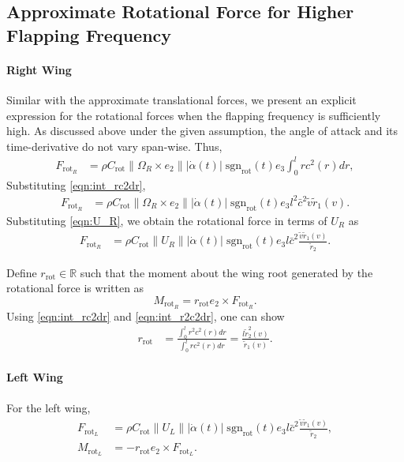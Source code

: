 \documentclass[conf]{new-aiaa}
\newcommand{\rot}{\ensuremath{\mathrm{rot}}}
\renewcommand{\Re}{\ensuremath{\mathbb{R}}}
\begin{document}
\subsection{Approximate Rotational Force for Higher Flapping Frequency}

\paragraph{Right Wing}

Similar with the approximate translational forces, we present an explicit expression for the rotational forces when the flapping frequency is sufficiently high. 
As discussed above under the given assumption, the angle of attack and its time-derivative do not vary span-wise.
Thus,
\begin{align*}
    F_{\rot_R} & = \rho C_\rot  \|\Omega_R \times e_2 \| |\dot\alpha(t)|\; \mathrm{sgn}_\rot(t)  e_3 \int_0^l r c^2(r) dr,
\end{align*}
Substituting \eqref{eqn:int_rc2dr},
\begin{align*}
    F_{\rot_R} & = \rho C_\rot  \|\Omega_R \times e_2 \| |\dot\alpha(t)|\; \mathrm{sgn}_\rot(t)  e_3 l^2 \bar c^2 \tilde v \tilde r_1(v).
\end{align*}
Substituting \eqref{eqn:U_R}, we obtain the rotational force in terms of $U_R$ as 
\begin{align}
    F_{\rot_R} & = \rho C_\rot  \|U_R \| |\dot\alpha(t)|\; \mathrm{sgn}_\rot(t)  e_3 l \bar c^2 \frac{\tilde v \tilde r_1(v)}{\tilde r_2}. \label{eqn:F_rot}
\end{align}

Define $r_\rot\in\Re$ such that the moment about the wing root generated by the rotational force is written as
\begin{equation}
    M_{\rot_R} = r_\rot e_2 \times F_{\rot_R}.
\end{equation}
Using \eqref{eqn:int_rc2dr} and \eqref{eqn:int_r2c2dr}, one can show
\begin{align}
    r_\rot & = \frac{\int_0^l r^2 c^2(r) dr}{\int_0^l r c^2(r) dr} = \frac{l\tilde r_2^2(v)}{\tilde r_1(v)}.
\end{align}

\paragraph{Left Wing}

For the left wing,
\begin{align}
    F_{\rot_L} & = \rho C_\rot  \|U_L \| |\dot\alpha(t)|\; \mathrm{sgn}_\rot(t)  e_3 l \bar c^2 \frac{\tilde v \tilde r_1(v)}{\tilde r_2}, \label{eqn:F_rot_L}\\
    M_{\rot_L} &  = -r_\rot e_2 \times F_{\rot_L}.
\end{align}
\end{document}
